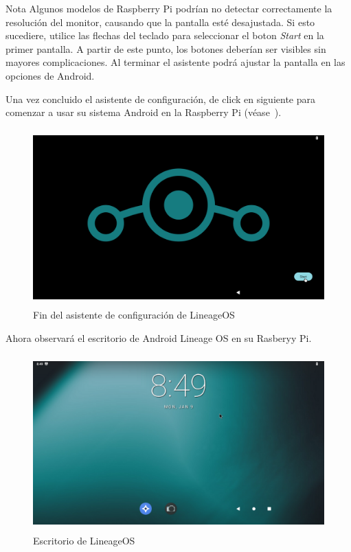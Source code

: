 \documentclass[letterpaper,10.5pt]{article}
\begin{document}
\medskip{}
\begin{greenbox}{Nota}
Algunos modelos de Raspberry Pi podrían no detectar correctamente la resolución del monitor, causando que la pantalla esté desajustada.
\medskip{}
Si esto sucediere, utilice las flechas del teclado para seleccionar el boton \emph{Start} en la primer pantalla.
A partir de este punto, los botones deberían ser visibles sin mayores complicaciones.
Al terminar el asistente podrá ajustar la pantalla en las opciones de Android.
\end{greenbox}
\medskip{}

\noindent
Una vez concluido el asistente de configuración, de click en siguiente para comenzar a usar su sistema Android en la Raspberry Pi (véase~).
\begin{figure}[H]
	\centering
	\includegraphics[width=0.9\linewidth,height=68mm,keepaspectratio]{img/p02-03-wizard-9.png} %
	\caption{Fin del asistente de configuración de LineageOS}
	\label{fig:lineageOS-wizard-end} %
\end{figure}

Ahora observará el escritorio de Android Lineage OS en su Rasberyy Pi.

\begin{figure}[H]
	\centering
	\includegraphics[width=0.9\linewidth,height=68mm,keepaspectratio]{img/P02-04-desktop.png} %
	\caption{Escritorio de LineageOS}
	\label{fig:lineageOS-desktop} %
\end{figure}
\end{document}
